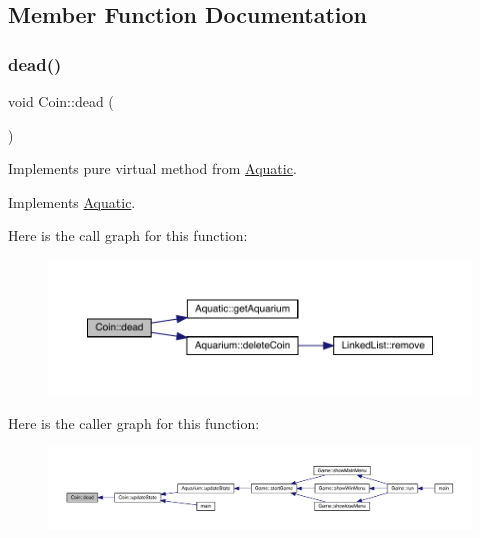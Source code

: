 \subsection{Member Function Documentation}
\mbox{\label{class_coin_af0c650f68a63698691c574fbef940776}} 
\subsubsection{\texorpdfstring{dead()}{dead()}}
{\footnotesize\ttfamily void Coin\+::dead (\begin{DoxyParamCaption}{ }\end{DoxyParamCaption})\hspace{0.3cm}{\ttfamily [virtual]}}



Implements pure virtual method from \mbox{\hyperlink{class_aquatic}{Aquatic}}. 



Implements \mbox{\hyperlink{class_aquatic_a22fdb11e9cfec922fe50638709768276}{Aquatic}}.

Here is the call graph for this function\+:\nopagebreak
\begin{figure}[H]
\begin{center}
\leavevmode
\includegraphics[width=350pt]{class_coin_af0c650f68a63698691c574fbef940776_cgraph}
\end{center}
\end{figure}
Here is the caller graph for this function\+:
\nopagebreak
\begin{figure}[H]
\begin{center}
\leavevmode
\includegraphics[width=350pt]{class_coin_af0c650f68a63698691c574fbef940776_icgraph}
\end{center}
\end{figure}
\mbox{\label{class_coin_a53c8bf65afdde1422cfda51d753d74b7}} 
